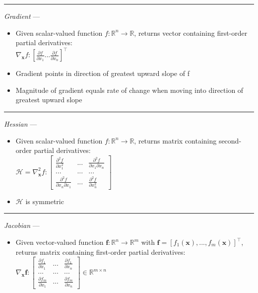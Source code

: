 {\color{lightgray}\hrule height 0.001mm}

\emph{Gradient} --- 
\begin{itemize}
    \item Given scalar-valued function $f: \mathbb{R}^{n} \rightarrow \mathbb{R}$, returns vector containing first-order partial derivatives:\\
    $\nabla_{\boldsymbol{x}} f: [\frac{\partial f}{\partial x_1} ... \frac{\partial f}{\partial x_n}]^\intercal$
    \item Gradient points in direction of greatest upward slope of f \item Magnitude of gradient equals rate of change when moving into direction of greatest upward slope 
\end{itemize}

{\color{lightgray}\hrule height 0.001mm}

\emph{Hessian} --- 
\begin{itemize}
    \item Given scalar-valued function $f: \mathbb{R}^{n} \rightarrow \mathbb{R}$, returns matrix containing second-order partial derivatives:\\
    $\mathcal{H} = \nabla_{\boldsymbol{x}}^2 f: \begin{bmatrix}
    \frac{\partial^2 f}{\partial x_1^2} & ... & \frac{\partial^2 f}{\partial x_1 \partial x_n} \\
    ... & ... & ... \\
    \frac{\partial^2 f}{\partial x_n \partial x_1} & ... & \frac{\partial^2 f}{\partial x_n^2}
    \end{bmatrix}$
    \item $\mathcal{H}$ is symmetric 
\end{itemize}

{\color{lightgray}\hrule height 0.001mm}

\emph{Jacobian} --- 
\begin{itemize}
    \item Given vector-valued function $\boldsymbol{f}: \mathbb{R}^{n} \rightarrow \mathbb{R}^{m}$ with $\boldsymbol{f} = [f_1(\boldsymbol{x}), ..., f_m(\boldsymbol{x})]^\intercal$, returns matrix containing first-order partial derivatives:\\
    $\nabla_{\boldsymbol{x}} \boldsymbol{f}: \begin{bmatrix}
    \frac{\partial f_1}{\partial x_1} & ... & \frac{\partial f_1}{\partial x_n} \\
    ... & ... & ... \\
    \frac{\partial f_m}{\partial x_1} & ... & \frac{\partial f_m}{\partial x_n}
    \end{bmatrix} \in \mathbb{R}^{m \times n}$
\end{itemize}

